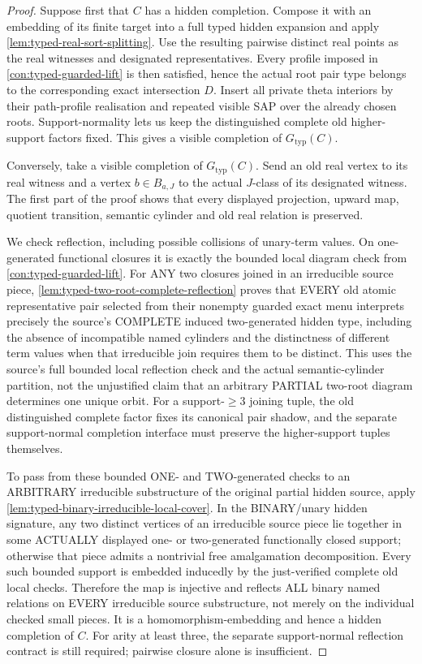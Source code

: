 \begin{proof}
Suppose first that \(C\) has a hidden completion.  Compose it with an embedding
of its finite target into a full typed hidden expansion and apply
\cref{lem:typed-real-sort-splitting}.  Use the resulting pairwise distinct
real points as the real witnesses and designated representatives.  Every
profile imposed in \cref{con:typed-guarded-lift} is then satisfied, hence the
actual root pair type belongs to the corresponding exact intersection \(D\).
Insert all private theta interiors by their path-profile realisation and
repeated visible SAP over the already chosen roots.  Support-normality lets us
keep the distinguished complete old higher-support factors fixed.  This gives
a visible completion of \(G_{\mathrm{typ}}(C)\).

Conversely, take a visible completion of \(G_{\mathrm{typ}}(C)\).  Send an
old real vertex to its real witness and a vertex \(b\in B_{a,J}\) to the
actual \(J\)-class of its designated witness.  The first part of the proof
shows that every displayed projection, upward map, quotient transition,
semantic cylinder and old real relation is preserved.

We check reflection, including possible collisions
of unary-term values. On one-generated
functional closures it is exactly the
bounded local diagram check from
\cref{con:typed-guarded-lift}.
For ANY two closures joined in an
irreducible source piece,
\cref{lem:typed-two-root-complete-reflection}
proves that EVERY old atomic
representative pair selected from
their nonempty guarded exact menu
interprets precisely the source's
COMPLETE induced two-generated
hidden type, including the
absence of incompatible named
cylinders and the distinctness
of different term values when
that irreducible join requires
them to be distinct. This
uses the source's full bounded
local reflection check and the
actual semantic-cylinder
partition, not the unjustified
claim that an arbitrary
PARTIAL two-root diagram
determines one unique orbit.
For a support-\(\ge3\)
joining tuple, the old
distinguished complete factor
fixes its canonical pair
shadow, and the separate
support-normal completion
interface must preserve the
higher-support tuples
themselves.

To pass from these bounded ONE-
and TWO-generated checks
to an ARBITRARY irreducible
substructure of the original
partial hidden source, apply
\cref{lem:typed-binary-irreducible-local-cover}.
In the BINARY/unary hidden
signature, any two distinct
vertices of an irreducible
source piece lie together
in some ACTUALLY displayed
one- or two-generated
functionally closed support;
otherwise that piece
admits a nontrivial free
amalgamation decomposition.
Every such bounded support
is embedded inducedly by
the just-verified complete
old local checks. Therefore
the map is injective and
reflects ALL binary named
relations on EVERY
irreducible source
substructure, not merely
on the individual checked
small pieces. It is a
homomorphism-embedding
and hence a hidden
completion of \(C\).
For arity at least three,
the separate support-normal
reflection contract is still
required; pairwise closure
alone is insufficient.
\end{proof}

